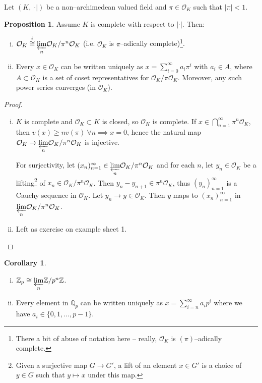 \documentclass{article}
\theoremstyle{definition}
\newtheorem{cor}[theorem]{Corollary}
\newtheorem{prop}[theorem]{Proposition}
\begin{document}
Let $(K, |\cdot|)$ be a non--archimedean valued field and $\pi \in \mathcal{O}_K$  such that $|\pi|<1$.
\begin{prop}
    Assume $K$ is complete with respect to $|\cdot|$. Then:
    \begin{enumerate}[(i)]
        \item $\mathcal{O}_K \stackrel{i}{\cong} \underset{n}{\varprojlim} \mathcal{O}_K/\pi^n \mathcal{O}_K$ (i.e. $\mathcal{O}_K$ is $\pi$--adically complete)\footnote{There a bit of abuse of notation here -- really, $\mathcal{O}_K$ is $(\pi)$--adically complete.}.
        \item Every $x \in \mathcal{O}_K$ can be written uniquely as $x = \sum_{i=0}^{\infty} a_i \pi^i$ with $a_i \in A$, where $A \subset \mathcal{O}_K$ is a set of coset representatives for $\mathcal{O}_K/\pi \mathcal{O}_K$. Moreover, any such power series converges (in $\mathcal{O}_K$).
    \end{enumerate}
\end{prop} 
\begin{proof}
    \begin{enumerate}[(i)]
        \item $K$ is complete and $\mathcal{O}_K \subset K$ is closed, so $\mathcal{O}_K$ is complete. If $x \in \bigcap_{n=1}^{\infty} \pi^n \mathcal{O}_K$, then $v(x) \ge n v(\pi) ~\forall n \implies x = 0$, hence the natural map $\mathcal{O}_K \to \underset{n}{\varprojlim} \mathcal{O}_K/\pi^n \mathcal{O}_K$ is injective.
        
        For surjectivity, let $(x_n)_{n=1}^{\infty} \in \underset{n}{\varprojlim}\mathcal{O}_K/ \pi^n \mathcal{O}_K$ and for each $n$, let $y_n \in \mathcal{O}_K$ be a lifting\footnote{Given a surjective map $G \to G'$, a lift of an element $x \in G'$ is a choice of $y \in G$ such that $y \mapsto x$ under this map.} of $x_n \in \mathcal{O}_K/\pi^n \mathcal{O}_K$. Then $y_n - y_{n+1}  \in \pi^n \mathcal{O}_K$, thus $(y_n)_{n=1}^{\infty}$ is a Cauchy sequence in $\mathcal{O}_K$. Let $y_n \to y \in \mathcal{O}_K$. Then $y$ maps to $(x_n)_{n=1}^\infty$ in $\underset{n}{\varprojlim} \mathcal{O}_K/\pi^n \mathcal{O}_K$.
        \item Left as exercise on example sheet 1.
    \end{enumerate}
\end{proof}
\begin{cor}\label{cor3.4}
    \begin{enumerate}[(i)]
        \item $\mathbb{Z}_p \cong \underset{n}{\varprojlim} \mathbb{Z}/p^n \mathbb{Z}$.
        \item Every element in $\mathbb{Q}_p$ can be written uniquely as $x = \sum_{i=n}^{\infty} a_i p^i$ where we have $a_i \in \{0,1,\ldots,p-1\}$.
    \end{enumerate}
\end{cor}
\end{document}
